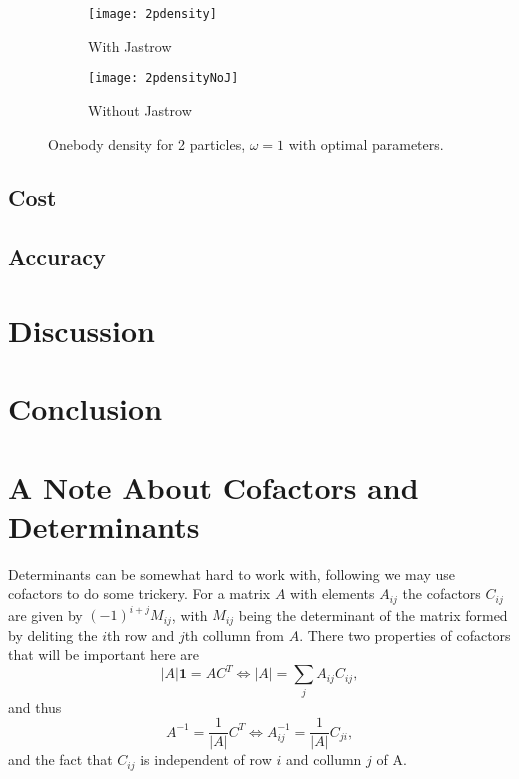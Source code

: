 \documentclass[a4paper,English,10pt]{article}
\newcommand{\bb}[1]{\boldsymbol{#1}}
\newcommand{\id}{\bb{1}}
\newcommand{\be}{\begin{equation}}
\newcommand{\ee}{\end{equation}}
\newcommand{\f}{\frac}
\begin{document}
\begin{figure}
  \centering
  \begin{subfigure}{0.5\textwidth}
    \centering
    \texttt{[image: 2pdensity]}
    \caption{With Jastrow}
    \label{fig:inclu}
  \end{subfigure}%
  \begin{subfigure}{0.5\textwidth}
    \centering
    \texttt{[image: 2pdensityNoJ]}
    \caption{Without Jastrow}
    \label{fig:deform}
  \end{subfigure}
  \caption{Onebody density for 2 particles, $\omega = 1$ with optimal parameters.}
  \label{fig:onebody}
\end{figure}
\subsection{Cost}

\subsection{Accuracy}


\section{Discussion}

\section{Conclusion}



\appendix
\section{A Note About Cofactors and Determinants}\label{cofac}
Determinants can be somewhat hard to work with, following \cite{mortenbok} we may use cofactors to do some trickery.
For a matrix $A$ with elements $A_{ij}$ the cofactors $C_{ij}$ are given by $(-1)^{i+j} M_{ij}$, with $M_{ij}$ being the determinant of the matrix formed by deliting the $i$th
row and $j$th collumn from $A$. There two properties of cofactors that will be important here are
\be
|A|\id = A C^T \Leftrightarrow |A| = \sum_jA_{ij}C_{ij},
\ee
and thus
\be
A^{-1} = \f{1}{|A|}C^T \Leftrightarrow A^{-1}_{ij} = \f{1}{|A|}C_{ji},
\ee
and the fact that $C_{ij}$ is independent of row $i$ and collumn $j$ of A.
\end{document}
